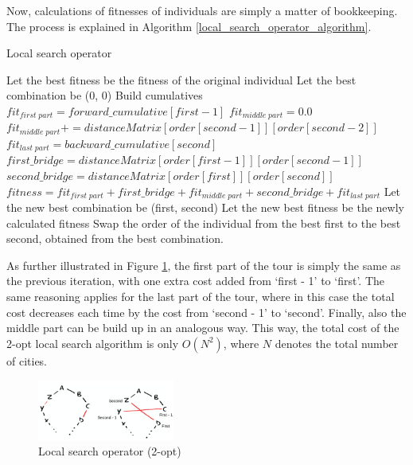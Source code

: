 \documentclass[a4paper,10pt]{article}
\begin{document}
Now, calculations of fitnesses of individuals are simply a matter of bookkeeping. The process is explained in Algorithm \ref{local_search_operator_algorithm}.


\begin{algorithm}
\caption{Local search operator}\label{local_search_operator_algorithm}
\begin{algorithmic}
\State Let the best fitness be the fitness of the original individual
\State Let the best combination be (0, 0)
\State Build cumulatives
\State $fit_{first \; part} = forward\_cumulative[first - 1]$
\State $fit_{middle \; part} = 0.0$
\State $fit_{middle \; part} \mathrel{{+}{=}} distanceMatrix[order[second-1]][order[second-2]]$
\State $fit_{last \; part} = backward\_cumulative[second]$
\State $first\_bridge = distanceMatrix[order[first-1]][order[second-1]]$
\State $second\_bridge = distanceMatrix[order[first]][order[second]]$
\State $fitness = fit_{first \; part} + first\_bridge + fit_{middle \; part} + second\_bridge + fit_{last \; part}$
\State Let the new best combination be (first, second)
\State Let the new best fitness be the newly calculated fitness
\EndIf
\EndFor
\EndFor
\State Swap the order of the individual from the best first to the best second, obtained from the best combination.
\end{algorithmic}
\end{algorithm}

As further illustrated in Figure \ref{local_search_operator_2_opt}, the first part of the tour is simply the same as the previous iteration, with one extra cost added from `first - 1' to `first'. The same reasoning applies for the last part of the tour, where in this case the total cost decreases each time by the cost from `second - 1' to `second'. Finally, also the middle part can be build up in an analogous way. This way, the total cost of the 2-opt local search algorithm is only $O(N^2)$, where $N$ denotes the total number of cities. 

\begin{figure}[H]
\caption{Local search operator (2-opt) \cite{local_search_slides}}
\label{local_search_operator_2_opt}
\centering
\includegraphics[width=0.4\textwidth]{local_search_operator_2_opt.png}
\end{figure}
\end{document}
